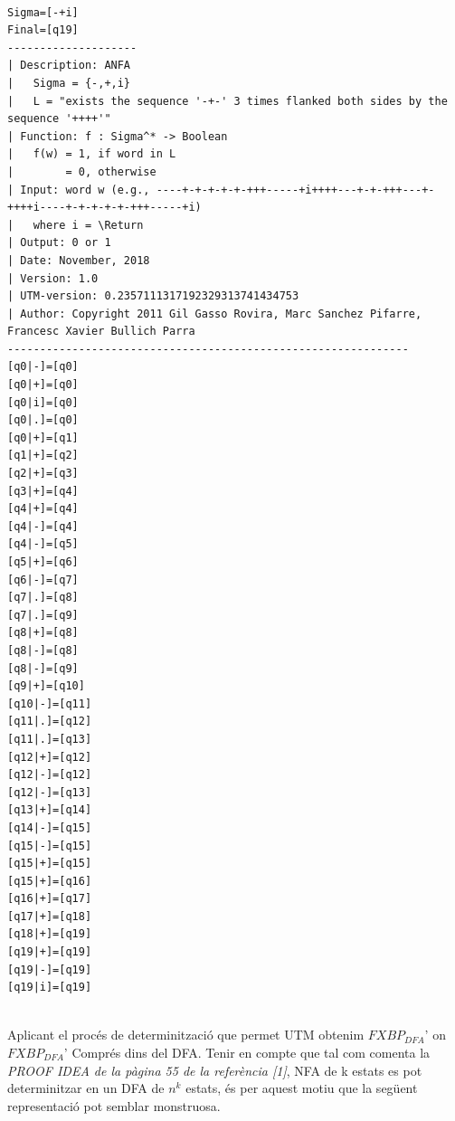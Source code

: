 \documentclass[12pt,a4paper]{report}
\def \dfa{$FXBP_{DFA} $}
\begin{document}
\begin{lstlisting}

Sigma=[-+i]
Final=[q19]
--------------------
| Description: ANFA
|   Sigma = {-,+,i}
|   L = "exists the sequence '-+-' 3 times flanked both sides by the sequence '++++'"
| Function: f : Sigma^* -> Boolean
|   f(w) = 1, if word in L
|        = 0, otherwise
| Input: word w (e.g., ----+-+-+-+-+-+++-----+i++++---+-+-+++---+-++++i----+-+-+-+-+-+++-----+i)
|   where i = \Return
| Output: 0 or 1
| Date: November, 2018
| Version: 1.0
| UTM-version: 0.2357111317192329313741434753
| Author: Copyright 2011 Gil Gasso Rovira, Marc Sanchez Pifarre, Francesc Xavier Bullich Parra
--------------------------------------------------------------
[q0|-]=[q0]
[q0|+]=[q0]
[q0|i]=[q0]
[q0|.]=[q0]
[q0|+]=[q1]
[q1|+]=[q2]
[q2|+]=[q3]
[q3|+]=[q4]
[q4|+]=[q4]
[q4|-]=[q4]
[q4|-]=[q5]
[q5|+]=[q6]
[q6|-]=[q7]
[q7|.]=[q8]
[q7|.]=[q9]
[q8|+]=[q8]
[q8|-]=[q8]
[q8|-]=[q9]
[q9|+]=[q10]
[q10|-]=[q11]
[q11|.]=[q12]
[q11|.]=[q13]
[q12|+]=[q12]
[q12|-]=[q12]
[q12|-]=[q13]
[q13|+]=[q14]
[q14|-]=[q15]
[q15|-]=[q15]
[q15|+]=[q15]
[q15|+]=[q16]
[q16|+]=[q17]
[q17|+]=[q18]
[q18|+]=[q19]
[q19|+]=[q19]
[q19|-]=[q19]
[q19|i]=[q19]


\end{lstlisting}

Aplicant el procés de determinització que permet UTM obtenim \dfa' on \dfa' Comprés dins del DFA. Tenir en compte que tal com comenta la \textit{PROOF IDEA de la pàgina 55 de la referència [1]}, NFA de k estats es pot determinitzar en un DFA de $n^k$ estats, és per aquest motiu que la següent representació pot semblar monstruosa. 
\end{document}

